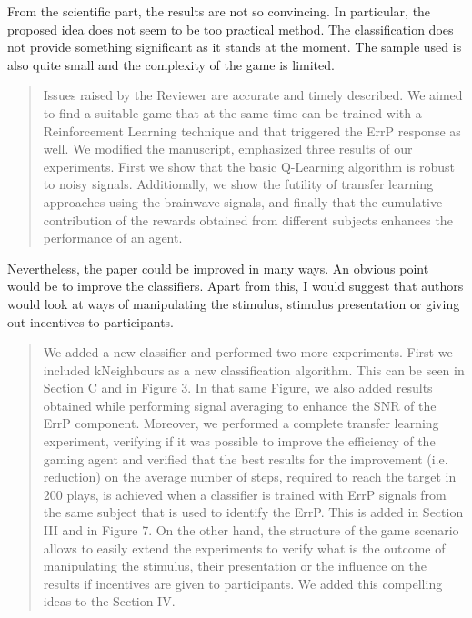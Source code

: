 \documentclass[journal,onecolumn,12pt]{IEEEtran}
\begin{document}
From the scientific part, the results are not so convincing. In particular, the proposed idea does not seem to be too practical method. The classification does not provide something significant as it stands at the moment. The sample used is also quite small and the complexity of the game is limited.

\begin{quotation}
{\color{blue}
Issues raised by the Reviewer are accurate and timely described.  We aimed to find a suitable game that at the same time can be trained with a Reinforcement Learning technique and that triggered the ErrP response as well.  We modified the manuscript, emphasized three results of our experiments.  First we show that the basic Q-Learning algorithm is robust to noisy signals.  Additionally,  we show the futility of transfer learning approaches using the brainwave signals, and finally that the cumulative contribution of the rewards obtained from different subjects enhances the performance of an agent.
}
\end{quotation}


Nevertheless, the paper could be improved in many ways. An obvious point would be to improve the classifiers. Apart from this, I would suggest that authors would look at ways of manipulating the stimulus, stimulus presentation or giving out incentives to participants.

\begin{quotation}
{\color{blue}
We added a new classifier and performed two more experiments.  First we included kNeighbours as a new classification algorithm.  This can be seen in Section C and in Figure 3.  In that same Figure, we also added results obtained while performing signal averaging to enhance the SNR of the ErrP component. Moreover, we performed a complete transfer learning experiment, verifying if it was possible to improve the efficiency of the gaming agent and verified that the best results for the improvement (i.e. reduction) on the average number of steps, required to reach the target in 200 plays, is achieved when a classifier is trained with ErrP signals from the same subject that is used to identify the ErrP.    This is added in Section III and in Figure 7.
On the other hand, the structure of the game scenario allows to easily extend the experiments to verify what is the outcome of manipulating the stimulus, their presentation or the influence on the results if incentives are given to participants.  We added this compelling ideas to the Section IV.
}
\end{quotation}
\end{document}
